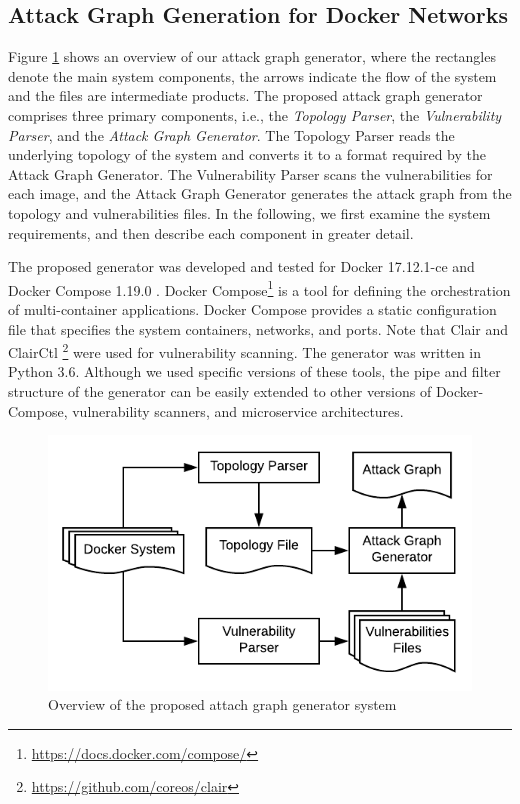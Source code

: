 \subsection{Attack Graph Generation for Docker Networks}
\label{chap:technical}

 Figure \ref{AttackGraphSystem} shows an overview of our attack graph generator, where the rectangles denote the main system components, the arrows indicate the flow of the system and the files are intermediate products. The proposed attack graph generator comprises three primary components, i.e., the \textit{Topology Parser}, the \textit{Vulnerability Parser}, and the \textit{Attack Graph Generator}. The Topology Parser reads the underlying topology of the system and converts it to a format required by the Attack Graph Generator. The Vulnerability Parser scans the vulnerabilities for each image, and the Attack Graph Generator generates the attack graph from the topology and vulnerabilities files. In the following, we first examine the system requirements, and then describe each component in greater detail.

The proposed generator was developed and tested for Docker 17.12.1-ce and Docker Compose 1.19.0 \cite{merkel2014docker}. Docker Compose\footnote{\url{https://docs.docker.com/compose/}} is a tool for defining the orchestration of  multi-container applications. Docker Compose provides a static configuration file that specifies the system containers, networks, and ports. Note that Clair and ClairCtl \footnote{\url{https://github.com/coreos/clair}} were used for vulnerability scanning. The generator was written in Python 3.6. Although we used specific versions of these tools, the pipe and filter structure of the generator can be easily extended to other versions of Docker-Compose, vulnerability scanners, and microservice architectures.


\begin{figure}
	\includegraphics[scale=0.9]{./images/AttackGraphSystem}
	\caption{Overview of the proposed attach graph generator system}
	\label{AttackGraphSystem}
\end{figure}

